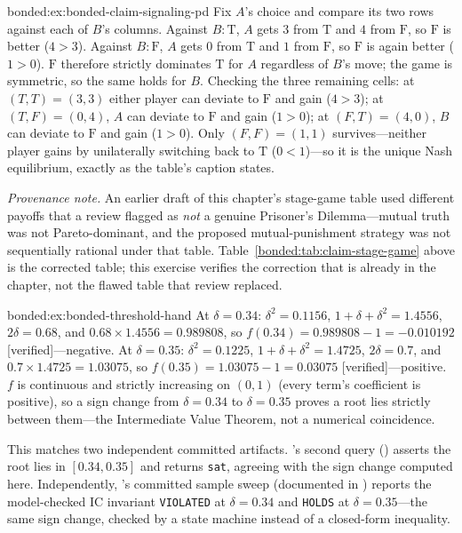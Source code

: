 \begin{pdSolution}{bonded:ex:bonded-claim-signaling-pd}
Fix $A$'s choice and compare its two rows against each of $B$'s columns. Against $B{:}\mathrm{T}$, $A$ gets $3$ from $\mathrm{T}$ and $4$ from $\mathrm{F}$, so $\mathrm{F}$ is better ($4>3$). Against $B{:}\mathrm{F}$, $A$ gets $0$ from $\mathrm{T}$ and $1$ from $\mathrm{F}$, so $\mathrm{F}$ is again better ($1>0$). $\mathrm{F}$ therefore strictly dominates $\mathrm{T}$ for $A$ regardless of $B$'s move; the game is symmetric, so the same holds for $B$. Checking the three remaining cells: at $(T,T)=(3,3)$ either player can deviate to $\mathrm{F}$ and gain ($4>3$); at $(T,F)=(0,4)$, $A$ can deviate to $\mathrm{F}$ and gain ($1>0$); at $(F,T)=(4,0)$, $B$ can deviate to $\mathrm{F}$ and gain ($1>0$). Only $(F,F)=(1,1)$ survives---neither player gains by unilaterally switching back to $\mathrm{T}$ ($0<1$)---so it is the unique Nash equilibrium, exactly as the table's caption states.

\emph{Provenance note.} An earlier draft of this chapter's stage-game table used different payoffs that a review flagged as \emph{not} a genuine Prisoner's Dilemma---mutual truth was not Pareto-dominant, and the proposed mutual-punishment strategy was not sequentially rational under that table. Table~\ref{bonded:tab:claim-stage-game} above is the corrected table; this exercise verifies the correction that is already in the chapter, not the flawed table that review replaced.
\end{pdSolution}
\begin{pdSolution}{bonded:ex:bonded-threshold-hand}
At $\delta=0.34$: $\delta^2=0.1156$, $1+\delta+\delta^2=1.4556$, $2\delta=0.68$, and $0.68\times1.4556=0.989808$, so $f(0.34)=0.989808-1=-0.010192$ [verified]---negative. At $\delta=0.35$: $\delta^2=0.1225$, $1+\delta+\delta^2=1.4725$, $2\delta=0.7$, and $0.7\times1.4725=1.03075$, so $f(0.35)=1.03075-1=0.03075$ [verified]---positive. $f$ is continuous and strictly increasing on $(0,1)$ (every term's coefficient is positive), so a sign change from $\delta=0.34$ to $\delta=0.35$ proves a root lies strictly between them---the Intermediate Value Theorem, not a numerical coincidence.

This matches two independent committed artifacts. 's second query () asserts the root lies in $[0.34, 0.35]$ and returns \texttt{sat}, agreeing with the sign change computed here. Independently, 's committed sample sweep (documented in ) reports the model-checked IC invariant \texttt{VIOLATED} at $\delta=0.34$ and \texttt{HOLDS} at $\delta=0.35$---the same sign change, checked by a state machine instead of a closed-form inequality.
\end{pdSolution}
